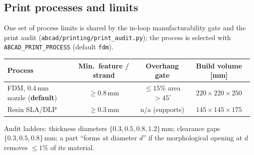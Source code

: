 \documentclass[11pt]{article}
\begin{document}
\subsection{Print processes and limits}\label{sec:limits}
One set of process limits is shared by the in-loop manufacturability gate and the print audit
(\texttt{abcad/printing/print\_audit.py}); the process is selected with \texttt{ABCAD\_PRINT\_PROCESS}
(default \texttt{fdm}).
\begin{center}
\begin{tabular}{@{}lccc@{}}
\toprule
Process & Min.\ feature / strand & Overhang gate & Build volume [mm] \\
\midrule
FDM, 0.4\,mm nozzle (\textbf{default}) & $\ge 0.8$\,mm & $\le 15\%$ area $>45^\circ$ & $220 \times 220 \times 250$ \\
Resin SLA/DLP & $\ge 0.3$\,mm & n/a (supports) & $145 \times 145 \times 175$ \\
\bottomrule
\end{tabular}
\end{center}
Audit ladders: thickness diameters $\{0.3, 0.5, 0.8, 1.2\}$\,mm; clearance gaps $\{0.3, 0.5, 0.8\}$\,mm;
a part ``forms at diameter $d$'' if the morphological opening at $d$ removes $\le 1\%$ of its material.
\end{document}
